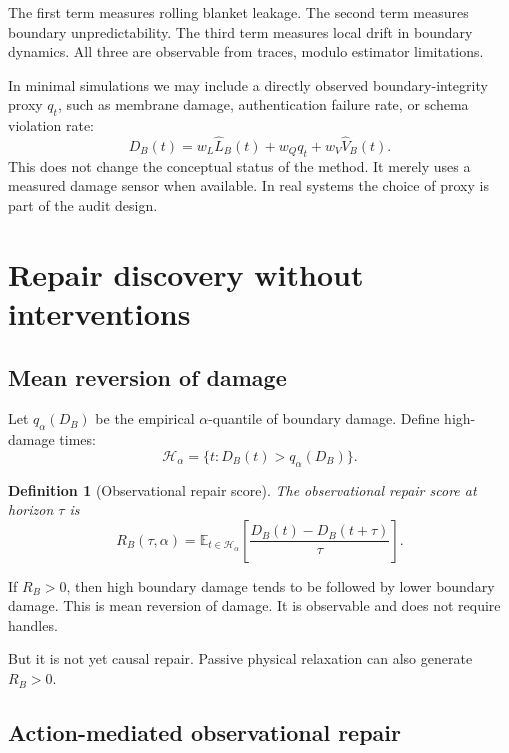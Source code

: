 \documentclass[11pt]{article}
\newtheorem{definition}{Definition}
\newcommand{\E}{\mathbb{E}}
\begin{document}
The first term measures rolling blanket leakage. The second term measures boundary unpredictability. The third term measures local drift in boundary dynamics. All three are observable from traces, modulo estimator limitations.

In minimal simulations we may include a directly observed boundary-integrity proxy $q_t$, such as membrane damage, authentication failure rate, or schema violation rate:
\begin{equation}
  D_B(t)
  =
  w_L \widehat{L}_B(t)
  +
  w_Q q_t
  +
  w_V \widehat{V}_B(t).
  \label{eq:damage-with-proxy}
\end{equation}
This does not change the conceptual status of the method. It merely uses a measured damage sensor when available. In real systems the choice of proxy is part of the audit design.

\section{Repair discovery without interventions}

\subsection{Mean reversion of damage}

Let $q_\alpha(D_B)$ be the empirical $\alpha$-quantile of boundary damage. Define high-damage times:
\begin{equation}
  \mathcal{H}_\alpha
  =
  \{t : D_B(t)>q_\alpha(D_B)\}.
\end{equation}

\begin{definition}[Observational repair score]
The observational repair score at horizon $\tau$ is
\begin{equation}
  R_B(\tau,\alpha)
  =
  \E_{t\in\mathcal{H}_\alpha}
  \left[
    \frac{D_B(t)-D_B(t+\tau)}{\tau}
  \right].
  \label{eq:repair-score}
\end{equation}
\end{definition}

If $R_B>0$, then high boundary damage tends to be followed by lower boundary damage. This is mean reversion of damage. It is observable and does not require handles.

But it is not yet causal repair. Passive physical relaxation can also generate $R_B>0$.

\subsection{Action-mediated observational repair}
\end{document}
